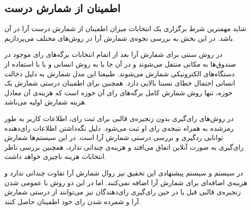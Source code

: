 \subsection{اطمینان از شمارش درست}
شاید مهمترین شرط برگزاری یک انتخابات میزان اطمینان از شمارش درست آرا در آن‌ باشد. در این بخش به بررسی نجوه‌ی شمارش آرا در روش‌های مختلف می‌پردازیم. 
\par
در روش سنتی برای شمارش آرا بعد از اتمام انتخابات برگه‌های رای‌ موجود در صندوق‌ها به مکانی منتقل می‌شوند و در آن‌ جا یا به روش انسانی و یا با استفاده از دستگاه‌های الکترونیکی شمارش می‌شوند. طبیعتا این مدل شمارش به دلیل دخالت انسانی احتمال خطای نسبتا بالایی دارد. همچنین برای اطمینان درستی شمارش یک حوزه، تنها روش شمارش کامل برگه‌های رای‌ آن حوزه است که هزینه‌ی آن معادل هزینه شمارش اولیه می‌باشد. 
\par 
در روش‌های رای‌گیری بدون زنجیره‌ی قالبی برای ثبت رای، اطلاعات کاربر به طور رمزشده به همراه نتیجه‌ی رای‌ او ثبت می‌شود. دلیل نگه‌داشتن اطلاعات رای‌دهنده توانایی رد‌گیری و بررسی درستی شمارش آرا است. در این سیستم‌ها شمارش رای‌گیری به صورت آنلاین اتفاق می‌افتد و هزینه‌ی چندانی ندارد، همچنین بررسی ناظر انتخابات هزینه‌ ناچیزی خواهد داشت. 
\par 
در سیستم  و سیستم پیشنهادی این تحقیق نیز روال شمارش آرا تفاوت چندانی ندارد و هزینه‌ی اضافه‌ای برای شمارش آرا اضافه نمی‌کنند. اما در این دو روش با عمومی شدن زنجیره‌ی قالبی قبل یا در حین رای‌گیری رای‌دهندگان نیز می‌توانند از درستی شمارش آرا و شمرده شدن رای خود اطمینان حاصل کنند. 
